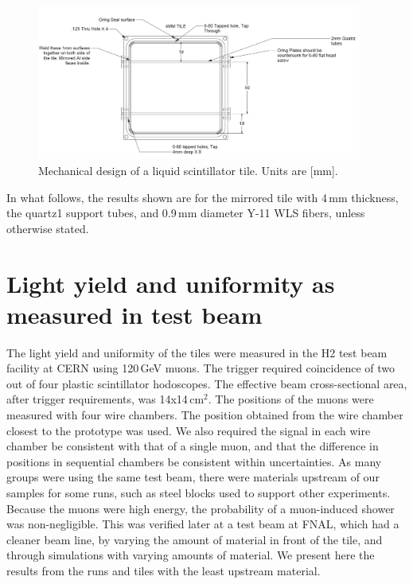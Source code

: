 \documentclass[review]{elsarticle}
\begin{document}
\begin{figure}[!ht]
\begin{center}
\includegraphics[width=0.95\textwidth]{./figures/mechanicaldesign.png}
\caption{Mechanical design of a liquid scintillator tile. Units are
  [mm].}
\label{fig:tiledesign}
\end{center}
\end{figure}

In what follows, the results shown are for the mirrored tile with 4\,mm
thickness, the quartz1 support tubes, and 0.9\,mm diameter Y-11 WLS fibers,
unless otherwise stated.

\section{Light yield and uniformity as measured in test beam}

The light yield and uniformity of the tiles were measured in the H2
test beam facility at CERN using 120\,GeV muons. The trigger required
coincidence of two out of four plastic scintillator hodoscopes. The
effective beam cross-sectional area, after trigger requirements, was
14x14\,cm$^2$. The positions of the muons were measured with four
wire chambers. The position obtained from the wire chamber closest to the
prototype was used. We also required the signal in each wire chamber
be consistent with that of a single muon, and that the difference in
positions in sequential chambers be consistent within uncertainties.
As many groups were using the same test beam, there were materials
upstream of our samples for some runs, such as steel blocks
used to support other experiments. Because the
muons were high energy, the probability of a muon-induced shower was
non-negligible. This was verified later at a test beam at FNAL, which
had a cleaner beam line, by varying the amount of material in front of the tile,
and through simulations with varying amounts of material. 
We present here the
results from the runs and tiles with the least upstream material.
\end{document}

